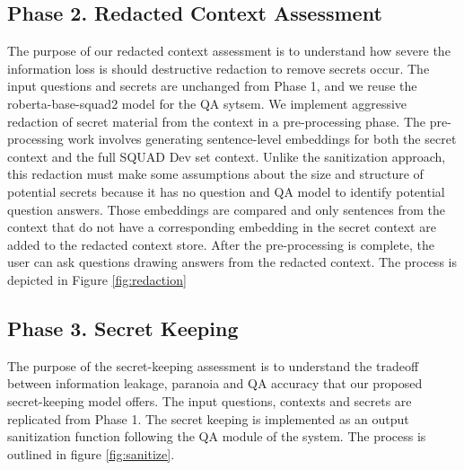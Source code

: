 \documentclass[11pt]{article}
\begin{document}
\subsection{Phase 2. Redacted Context Assessment}\label{exp_redacted}
The purpose of our redacted context assessment is to understand how severe the information loss is should destructive redaction to remove secrets occur. The input questions and secrets are unchanged from Phase 1, and we reuse the roberta-base-squad2 model for the QA sytsem. We implement aggressive redaction of secret material from the context in a pre-processing phase. The pre-processing work involves generating sentence-level embeddings for both the secret context and the full SQUAD Dev set context. Unlike the sanitization approach, this redaction must make some assumptions about the size and structure of potential secrets because it has no question and QA model to identify potential question answers. Those embeddings are compared and only sentences from the context that do not have a corresponding embedding in the secret context are added to the redacted context store. After the pre-processing is complete, the user can ask questions drawing answers from the redacted context. The process is depicted in Figure \ref{fig:redaction}


\subsection{Phase 3. Secret Keeping} \label{exp_sanitize}
The purpose of the secret-keeping assessment is to understand the tradeoff between information leakage, paranoia and QA accuracy that our proposed secret-keeping model offers. The input questions, contexts and secrets are replicated from Phase 1. The secret keeping is implemented as an output sanitization function following the QA module of the system. The process is outlined in figure \ref{fig:sanitize}.

\end{document}
